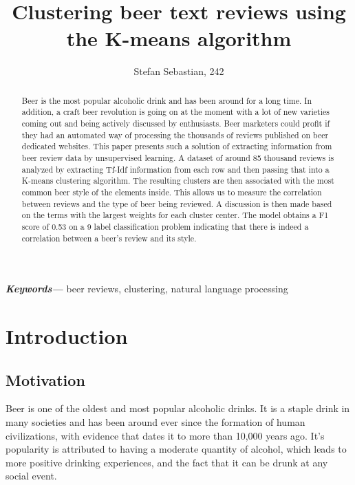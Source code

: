 \documentclass[12pt]{article}
\providecommand{\keywords}[1]
{
	\small	
	\textbf{\textit{Keywords---}} #1
}
\begin{document}
	\title{Clustering beer text reviews using the K-means algorithm}
	\author{Stefan Sebastian, 242}
	\date{}
	\maketitle
	
	\begin{abstract}
	Beer is the most popular alcoholic drink and has been around for a long time. In addition, a craft beer revolution is going on at the moment with a lot of new varieties coming out and being actively discussed by enthusiasts. Beer marketers could profit if they had an automated way of processing the thousands of reviews published on beer dedicated websites. This paper presents such a solution of extracting information from beer review data by unsupervised learning. A dataset of around 85 thousand reviews is analyzed by extracting Tf-Idf information from each row and then passing that into a K-means clustering algorithm. The resulting clusters are then associated with the most common beer style of the elements inside. This allows us to measure the correlation between reviews and the type of beer being reviewed. A discussion is then made based on the terms with the largest weights for each cluster center. The model obtains a F1 score of 0.53 on a 9 label classification problem indicating that there is indeed a correlation between a beer's review and its style.
	\end{abstract}

	\keywords{beer reviews, clustering, natural language processing}

	\newpage
	\tableofcontents
	\newpage
	
	\section{Introduction}
	\subsection{Motivation}
	Beer is one of the oldest and most popular alcoholic drinks. It is a staple drink in many societies and has been around ever since the formation of human civilizations, with evidence that dates it to more than 10,000 years ago\cite{BeerArticleTime}. It's popularity is attributed to having a moderate quantity of alcohol, which leads to more positive drinking experiences, and the fact that it can be drunk at any social event\cite{BeerArticleTime}.
	
\end{document}
